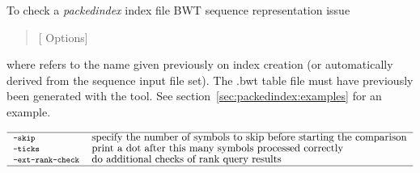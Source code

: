 \documentclass[12pt,titlepage]{article}
\newcommand{\packedindex}{\textit{packedindex}\xspace}
\begin{document}
To check a \packedindex index file BWT sequence representation issue
\begin{quote}
  \ttfamily%
     [{\rmfamily
    Options}] 
\end{quote}

where  refers to the name given previously on index
creation (or automatically derived from the sequence input file set).
The .bwt table file must have previously been generated with the
 tool. See
section~\ref{sec:packedindex:examples} for an example.

\begin{table}[htbp]
\caption{Overview of the \packedindex {} options.}
\begin{footnotesize}
\[
\renewcommand{\arraystretch}{0.89}
\begin{tabular}{ll}\hline
\Showoption{skip}& specify the number of symbols to skip before
starting the comparison
\\
\Showoption{ticks}& print a dot after this many symbols processed correctly
\\
\Showoption{ext-rank-check}& do additional checks of rank query results
\\
\hline
\end{tabular}
%
\]
\end{footnotesize}
\label{tab:packedindex:chkintegrity:options}
\end{table}

\begin{Justshowoptions}



\end{Justshowoptions}
\end{document}
